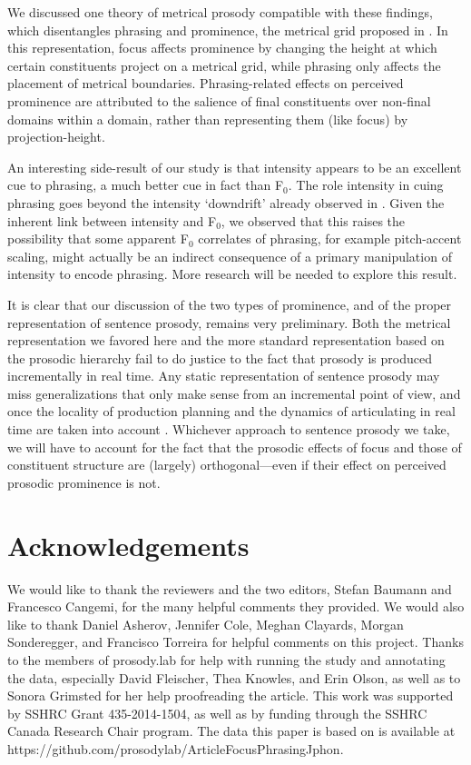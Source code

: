 \documentclass[preprint,review,12pt,authoryear,times]{elsarticle}
\begin{document}
We discussed one theory of metrical prosody compatible with these findings, which disentangles phrasing and prominence, the metrical grid proposed in \citet{wagner05recursion}. In this representation, focus affects prominence by changing the height at which certain constituents project on a metrical grid, while phrasing only affects the placement of metrical boundaries. Phrasing-related effects on perceived prominence are attributed to the salience of final constituents over non-final domains within a domain, rather than representing them (like focus) by projection-height. 

An interesting side-result of our study is that intensity appears to be an excellent cue to phrasing, a much better cue in fact than F$_0$. The role intensity in cuing phrasing goes beyond the intensity `downdrift' already observed in \citet{pierr79}. Given the inherent link between intensity and F$_0$, we observed that this raises the possibility that some apparent F$_0$ correlates of phrasing, for example pitch-accent scaling, might actually be an indirect consequence of a primary manipulation of intensity to encode phrasing. More research will be needed to explore this result.

It is clear that our discussion of the two types of prominence, and of the proper representation of sentence prosody, remains very preliminary. Both the metrical representation we favored here and the more standard representation based on the prosodic hierarchy fail to do justice to the fact that prosody is produced incrementally in real time. Any static representation of sentence prosody may miss generalizations that only make sense from an incremental point of view, and once the locality of production planning \citep[cf.][]{keati02} and the dynamics of articulating in real time are taken into account \citep[cf.][]{mucke14}. Whichever approach to sentence prosody we take, we will have to account for the fact that the prosodic effects of focus and those of constituent structure are (largely) orthogonal---even if their effect on perceived prosodic prominence is not.


\section*{Acknowledgements}

We would like to thank the reviewers and the two editors, Stefan Baumann and Francesco Cangemi, for the many helpful comments they provided. We  would also like to thank Daniel Asherov, Jennifer Cole, Meghan Clayards, Morgan Sonderegger, and Francisco Torreira for helpful comments on this project. Thanks to the members of prosody.lab for help with running the study and annotating the data, especially David Fleischer, Thea Knowles,  and Erin Olson, as well as to Sonora Grimsted for her help proofreading the article. This work was supported by SSHRC Grant 435-2014-1504, as well as by funding through the SSHRC Canada Research Chair program. The data this paper is based on is available at https://github.com/prosodylab/ArticleFocusPhrasingJphon.


\newpage


\end{document}
